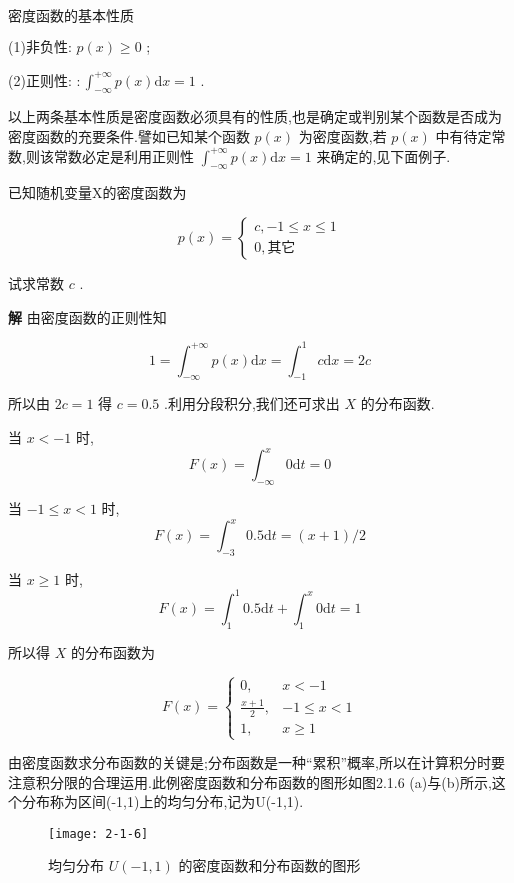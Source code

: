  $ 密度函数的基本性质 $ 

(1)非负性: $ p(x) \geqslant 0 $ ;

(2)正则性: $ : \int_{-\infty}^{+\infty} p(x) \mathrm{d} x=1 $ .

以上两条基本性质是密度函数必须具有的性质,也是确定或判别某个函数是否成为密度函数的充要条件.譬如已知某个函数 $ p(x) $ 为密度函数,若 $ p(x) $ 中有待定常数,则该常数必定是利用正则性 $ \int_{-\infty}^{+\infty} p(x) \mathrm{d} x=1 $ 来确定的,见下面例子.

\begin{example}
	已知随机变量X的密度函数为
	
	\[ 
	p(x)=\left\{\begin{array}{ll}
	{c,-1 \leqslant x \leqslant 1} \\ 
	{0,\text{其它}}
	\end{array}\right.
	\]
	
	试求常数 $ c $ .
	
	\textbf{解} 由密度函数的正则性知
	
	\[ 
	1=\int_{-\infty}^{+\infty} p(x) \mathrm{d} x=\int_{-1}^{1} c \mathrm{d} x=2 c
	\]
	
	所以由 $ 2c=1 $ 得 $ c=0.5 $ .利用分段积分,我们还可求出 $ X $ 的分布函数.
	
	当 $ x<-1 $ 时,
	\[ 
	F(x)=\int_{-\infty}^{x} 0 \mathrm{d} t=0
	\]
	
	当 $ -1 \leqslant x<1 $ 时,
	\[ 
	F(x)=\int_{-3}^{x} 0.5 \mathrm{d} t=(x+1) / 2
	\]
	
	当 $ x \geqslant 1 $ 时,
	\[ 
	F(x)=\int_{1}^{1} 0.5 \mathrm{d} t+\int_{1}^{x} 0 \mathrm{d} t=1
	\]
	
	所以得 $ X $ 的分布函数为
	
	\[ 
	F(x)=\left\{\begin{array}{ll}
	{0,} & {x<-1} \\ 
	{\frac{x+1}{2},} & {-1 \leqslant x<1} \\ 
	{1,} & {x \geqslant 1}
	\end{array}\right.
	\]
	
\end{example}


由密度函数求分布函数的关键是;分布函数是一种“累积”概率,所以在计算积分时要注意积分限的合理运用.此例密度函数和分布函数的图形如图2.1.6
(a)与(b)所示,这个分布称为区间(-1,1)上的均匀分布,记为U(-1,1).

\begin{figure}
	\centering
	\texttt{[image: 2-1-6]}
	\caption{均匀分布 $ U(-1,1) $ 的密度函数和分布函数的图形}
	\label{fig:2-1-6}
\end{figure}

